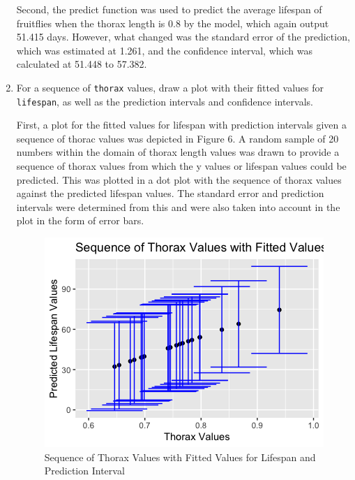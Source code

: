\documentclass[12pt,letterpaper]{article}
\begin{document}
\begin{enumerate}
	

	\vspace{.5cm}
	
	Second, the predict function was used to predict the average lifespan of fruitflies when the thorax length is 0.8 by the model, which again output 51.415 days. However, what changed was the standard error of the prediction, which was estimated at 1.261, and the confidence interval, which was calculated at 51.448 to 57.382. 
	
	

	
			\vspace{.5cm}
	\item	For a sequence of \texttt{thorax} values, draw a plot with their fitted values for \texttt{lifespan}, as well as the prediction intervals and confidence intervals.
	
	First, a plot for the fitted values for lifespan with prediction intervals given a sequence of thorac values was depicted in Figure 6. A random sample of 20 numbers within the domain of thorax length values was drawn to provide a sequence of thorax values from which the y values or lifespan values could be predicted. This was plotted in a dot plot with the sequence of thorax values against the predicted lifespan values. The standard error and prediction intervals were determined from this and were also taken into account in the plot in the form of error bars.
	
	
	
	\begin{figure}[h!]
		\caption{\footnotesize{Sequence of Thorax Values with Fitted Values for Lifespan and Prediction Interval}}
		\vspace{.5cm}
		\centering
		\label{fig:predictionintervals}
		\includegraphics[width=1\textwidth]{./PS2_Graph_5.png}
	\end{figure}	
	

\end{enumerate}
\end{document}
